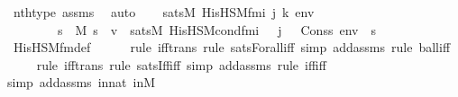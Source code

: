 \begin{isabellebody}
\ nth{\isacharunderscore}{\kern0pt}type\ assms\ \isamarkupfalse%
\ auto\isanewline
\isanewline
\ \ \isamarkupfalse%
\ {\isachardoublequoteopen}sats{\isacharparenleft}{\kern0pt}M{\isacharcomma}{\kern0pt}\ His{\isacharunderscore}{\kern0pt}HS{\isacharunderscore}{\kern0pt}M{\isacharunderscore}{\kern0pt}fm{\isacharparenleft}{\kern0pt}i{\isacharcomma}{\kern0pt}\ j{\isacharcomma}{\kern0pt}\ k{\isacharparenright}{\kern0pt}{\isacharcomma}{\kern0pt}\ env{\isacharparenright}{\kern0pt}\ {\isasymlongleftrightarrow}\ \isanewline
\ \ \ \ \ \ \ \ {\isacharparenleft}{\kern0pt}{\isasymforall}s\ {\isasymin}\ M{\isachardot}{\kern0pt}\ s\ {\isasymin}\ v\ {\isasymlongleftrightarrow}\ sats{\isacharparenleft}{\kern0pt}M{\isacharcomma}{\kern0pt}\ His{\isacharunderscore}{\kern0pt}HS{\isacharunderscore}{\kern0pt}M{\isacharunderscore}{\kern0pt}cond{\isacharunderscore}{\kern0pt}fm{\isacharprime}{\kern0pt}{\isacharparenleft}{\kern0pt}i\ {\isacharhash}{\kern0pt}{\isacharplus}{\kern0pt}\ {}{\isacharcomma}{\kern0pt}\ j\ {\isacharhash}{\kern0pt}{\isacharplus}{\kern0pt}\ {}{\isacharparenright}{\kern0pt}{\isacharcomma}{\kern0pt}\ Cons{\isacharparenleft}{\kern0pt}s{\isacharcomma}{\kern0pt}\ env{\isacharparenright}{\kern0pt}{\isacharparenright}{\kern0pt}\ {\isasymand}\ s\ {\isacharequal}{\kern0pt}\ {}{\isacharparenright}{\kern0pt}{\isachardoublequoteclose}\ \isanewline
\ \ \ \ \isamarkupfalse%
\ His{\isacharunderscore}{\kern0pt}HS{\isacharunderscore}{\kern0pt}M{\isacharunderscore}{\kern0pt}fm{\isacharunderscore}{\kern0pt}def\ \isanewline
\ \ \ \ \isamarkupfalse%
{\isacharparenleft}{\kern0pt}rule\ iff{\isacharunderscore}{\kern0pt}trans{\isacharcomma}{\kern0pt}\ rule\ sats{\isacharunderscore}{\kern0pt}Forall{\isacharunderscore}{\kern0pt}iff{\isacharcomma}{\kern0pt}\ simp\ add{\isacharcolon}{\kern0pt}assms{\isacharcomma}{\kern0pt}\ rule\ ball{\isacharunderscore}{\kern0pt}iff{\isacharparenright}{\kern0pt}\isanewline
\ \ \ \ \isamarkupfalse%
{\isacharparenleft}{\kern0pt}rule\ iff{\isacharunderscore}{\kern0pt}trans{\isacharcomma}{\kern0pt}\ rule\ sats{\isacharunderscore}{\kern0pt}Iff{\isacharunderscore}{\kern0pt}iff{\isacharcomma}{\kern0pt}\ simp\ add{\isacharcolon}{\kern0pt}assms{\isacharcomma}{\kern0pt}\ rule\ iff{\isacharunderscore}{\kern0pt}iff{\isacharparenright}{\kern0pt}\isanewline
\ \ \ \ \ \isamarkupfalse%
{\isacharparenleft}{\kern0pt}simp\ add{\isacharcolon}{\kern0pt}assms\ innat\ inM{\isacharparenright}{\kern0pt}\isanewline
\ \ \ \ \isamarkupfalse%

\end{isabellebody}
